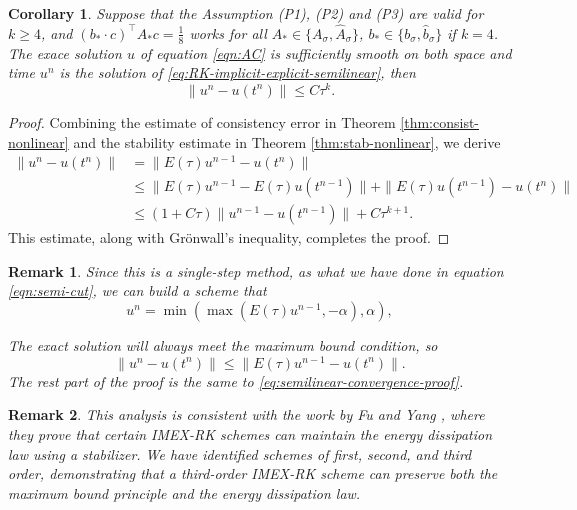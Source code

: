 \documentclass[a4paper, oneside]{book}
\def\hatA{{\hat{A}}}
\def\hatb{{\hat{b}}}
\newtheorem{remark}{Remark}[section]
\newtheorem{corollary}{Corollary}[section]
\begin{document}
\begin{corollary}
    Suppose that the {Assumption (P1), (P2) and (P3)} are valid for $k \geq 4$, 
    and $(b_* \cdot c)^\top A_* c = \frac18 $  
    works for all $A_* \in \{A_\sigma, \hatA_\sigma\}$, 
    $b_* \in \{b_\sigma, \hatb_\sigma\}$ if $k=4$.  
    The exace solution $u$ of equation \eqref{eqn:AC} is sufficiently smooth 
    on both space and time $u^n$ is the solution of \eqref{eq:RK-implicit-explicit-semilinear}, 
    then
    \begin{equation}\label{eq:semilinear-convergence}
        \|u^{n} - u(t^{n})\| \leq C\tau^{k}.
    \end{equation}
\end{corollary}
\begin{proof}
Combining the estimate of consistency error in Theorem \ref{thm:consist-nonlinear} and the stability estimate in Theorem \ref{thm:stab-nonlinear}, we derive
\begin{equation}\label{eq:semilinear-convergence-proof}
    \begin{aligned}
    \|u^{n} - u(t^{n})\| &= \|E(\tau)u^{n-1} - u(t^{n})\|\\
    &\leq  \|E(\tau)u^{n-1} - E(\tau)u(t^{n-1})\| + \|E(\tau)u(t^{n-1}) - u(t^{n})\|\\
    &\leq  (1+C\tau) \|u^{n-1}- u(t^{n-1})\| + C\tau^{k+1} .
    \end{aligned}
\end{equation} 
This estimate, along with Gr\"onwall's inequality, completes the proof.


\end{proof}

\begin{remark}
    Since this is a single-step method, as what we have done in equation \eqref{eqn:semi-cut}, 
    we can build a scheme that
    \begin{equation} \label{eq:semilinear-cutoff}
        u^{n} =  \min(\max( E(\tau) u^{n-1},-\alpha),\alpha),
    \end{equation}

    The exact solution will always meet the maximum bound condition, 
    so $$\|u^{n} - u(t^{n})\| \leq \|E(\tau)u^{n-1} - u(t^{n})\|.$$
    The rest part of the proof is the same to \eqref{eq:semilinear-convergence-proof}. 
\end{remark}

\begin{remark}\label{Remark:IMEX-Energy}
This analysis is consistent with the work by Fu and Yang \cite{fu2024energy}, where they prove that certain IMEX-RK schemes can maintain the energy dissipation law using a stabilizer. We have identified schemes of first, second, and third order, demonstrating that a third-order IMEX-RK scheme can preserve both the maximum bound principle and the energy dissipation law. 
\end{remark}
\end{document}

